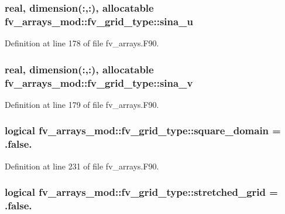 \subsubsection[{sina\-\_\-u}]{\setlength{\rightskip}{0pt plus 5cm}real, dimension(\-:,\-:), allocatable fv\-\_\-arrays\-\_\-mod\-::fv\-\_\-grid\-\_\-type\-::sina\-\_\-u}\label{structfv__arrays__mod_1_1fv__grid__type_a70d829477110ac82f38065460ef5b6b3}


Definition at line 178 of file fv\-\_\-arrays.\-F90.

\subsubsection[{sina\-\_\-v}]{\setlength{\rightskip}{0pt plus 5cm}real, dimension(\-:,\-:), allocatable fv\-\_\-arrays\-\_\-mod\-::fv\-\_\-grid\-\_\-type\-::sina\-\_\-v}\label{structfv__arrays__mod_1_1fv__grid__type_aa999d53d66859c4c08851b7a74e7449e}


Definition at line 179 of file fv\-\_\-arrays.\-F90.

\subsubsection[{square\-\_\-domain}]{\setlength{\rightskip}{0pt plus 5cm}logical fv\-\_\-arrays\-\_\-mod\-::fv\-\_\-grid\-\_\-type\-::square\-\_\-domain = .false.}\label{structfv__arrays__mod_1_1fv__grid__type_a95f5486b00cce83c0bf3896ef9906394}


Definition at line 231 of file fv\-\_\-arrays.\-F90.

\subsubsection[{stretched\-\_\-grid}]{\setlength{\rightskip}{0pt plus 5cm}logical fv\-\_\-arrays\-\_\-mod\-::fv\-\_\-grid\-\_\-type\-::stretched\-\_\-grid = .false.}\label{structfv__arrays__mod_1_1fv__grid__type_a59134caa7da3ff6f21dc66d5cf24f6ee}


